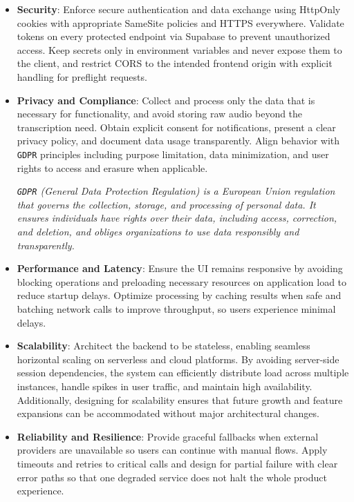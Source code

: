 \documentclass[12pt,a4paper]{article}
\begin{document}
\begin{itemize}
  \item \textbf{Security}: Enforce secure authentication and data exchange using HttpOnly cookies with appropriate SameSite policies and HTTPS everywhere. Validate tokens on every protected endpoint via Supabase to prevent unauthorized access. Keep secrets only in environment variables and never expose them to the client, and restrict CORS to the intended frontend origin with explicit handling for preflight requests.

  \item \textbf{Privacy and Compliance}: Collect and process only the data that is necessary for functionality, and avoid storing raw audio beyond the transcription need. Obtain explicit consent for notifications, present a clear privacy policy, and document data usage transparently. Align behavior with \texttt{GDPR} principles including purpose limitation, data minimization, and user rights to access and erasure when applicable.
  \begin{center}
  \small\textit{\texttt{GDPR} (General Data Protection Regulation) is a European Union regulation that governs the collection, storage, and processing of personal data. It ensures individuals have rights over their data, including access, correction, and deletion, and obliges organizations to use data responsibly and transparently.}
  \end{center}


  \item \textbf{Performance and Latency}: Ensure the UI remains responsive by avoiding blocking operations and preloading necessary resources on application load to reduce startup delays. Optimize processing by caching results when safe and batching network calls to improve throughput, so users experience minimal delays.

  \item \textbf{Scalability}: Architect the backend to be stateless, enabling seamless horizontal scaling on serverless and cloud platforms. By avoiding server-side session dependencies, the system can efficiently distribute load across multiple instances, handle spikes in user traffic, and maintain high availability. Additionally, designing for scalability ensures that future growth and feature expansions can be accommodated without major architectural changes.


  \item \textbf{Reliability and Resilience}: Provide graceful fallbacks when external providers are unavailable so users can continue with manual flows. Apply timeouts and retries to critical calls and design for partial failure with clear error paths so that one degraded service does not halt the whole product experience.


\end{itemize}
\end{document}

